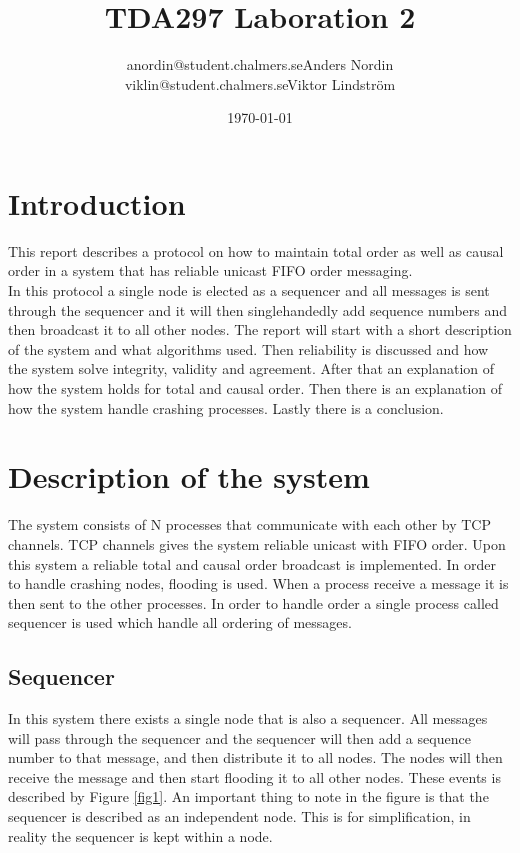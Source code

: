 \documentclass{article}
\title{TDA297 Laboration 2}
\author{anordin@student.chalmers.se\quad Anders Nordin\\
        viklin@student.chalmers.se\quad Viktor Lindstr\"{o}m}
\date{\today}
\begin{document}
\maketitle
\newpage

\section{Introduction}
  This report describes a protocol on how to maintain total order 
  as well as causal order in a system that has reliable unicast FIFO order messaging.\\
  In this protocol a single node is elected as a sequencer and all messages is sent through
  the sequencer and it will then singlehandedly add sequence numbers and then broadcast it
  to all other nodes.
  The report will start with a short description of the system and what algorithms used. 
  Then reliability is discussed and how the system solve integrity, validity and agreement.
  After that an explanation of how the system holds for total and causal order. Then there 
  is an explanation of how the system handle crashing processes. Lastly there is a conclusion.

\section{Description of the system}
 The system consists of N processes that communicate with each other by TCP channels.
 TCP channels gives the system reliable unicast with FIFO order. Upon this system a
 reliable total and causal order broadcast is implemented. 
 In order to handle crashing nodes, flooding is used. When a process receive a message
 it is then sent to the other processes. 
 In order to handle order a single process called sequencer is used which handle all
 ordering of messages.
 \subsection{Sequencer}
 \label{sequencer}
 In this system there exists a single node that is also a sequencer. All messages will 
 pass through the sequencer and the sequencer will then add a sequence number to that 
 message, and then distribute it to all nodes. The nodes will then receive the message 
 and then start flooding it to all other nodes. These events is described by Figure 
 \ref{fig1}. An important thing to note in the figure is that the sequencer is described 
 as an independent node. This is for simplification, in reality the sequencer is kept 
 within a node. \\
\end{document}

